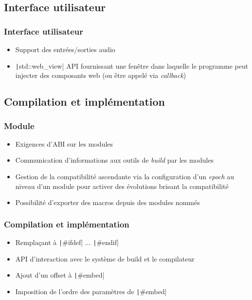 \documentclass[C++.tex]{subfiles}
\begin{document}
\subsection*{Interface utilisateur}
\begin{frame}[fragile]
	\frametitle{Interface utilisateur}
	\begin{itemize}
		\item Support des entrées/sorties audio
		\item \texttt|std::web_view| API fournissant une fenêtre dans laquelle le programme peut injecter des composants web (ou être appelé via \textit{callback})
	\end{itemize}
\end{frame}

\subsection*{Compilation et implémentation}
\begin{frame}[fragile]
	\frametitle{Module}
	\begin{itemize}
		\item Exigences d'ABI sur les modules
		\item Communication d'informations aux outils de \textit{build} par les modules
		\item Gestion de la compatibilité ascendante via la configuration d'un \textit{epoch} au niveau d'un module pour activer des évolutions brisant la compatibilité
		\item Possibilité d'exporter des macros depuis des modules nommés
	\end{itemize}

\end{frame}

\begin{frame}[fragile]
	\frametitle{Compilation et implémentation}
	\begin{itemize}
		\item Remplaçant à \texttt|#ifdef| ... \texttt|#endif|
		\item API d'interaction avec le système de build et le compilateur
		\item Ajout d'un offset à \texttt|#embed|
		\item Imposition de l'ordre des paramètres de \texttt|#embed|
	\end{itemize}

\end{frame}
\end{document}
